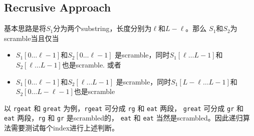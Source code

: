 \subsection{Recrusive Approach}
基本思路是将$S_1$分为两个substring，长度分别为$\ell$和$L-\ell$。那么 $S_1$和$S_2$为scramble当且仅当
\begin{itemize}
\item $S_1[0\ldots\ell-1]$和$S_2[0\ldots \ell-1]$ 是scramble，同时$S_1[\ell\ldots L-1]$和$S_2[\ell\ldots L-1]$也是scramble. 或者
\item $S_1[0\ldots\ell-1]$和$S_2[\ell\ldots L-1]$ 是scramble，同时$S_1[L-\ell\ldots L-1]$和$S_2[0\ldots L-\ell-1]$也是scramble
\end{itemize} 
以 \texttt{rgeat} 和 \texttt{great} 为例，\texttt{rgeat} 可分成 \texttt{rg} 和 \texttt{eat} 两段， \texttt{great} 可分成 \texttt{gr} 和 \texttt{eat} 两段，\texttt{rg} 和 \texttt{gr} 是scrambled的， \texttt{eat} 和 \texttt{eat} 当然是scrambled。因此递归算法需要测试每个index进行上述判断。

